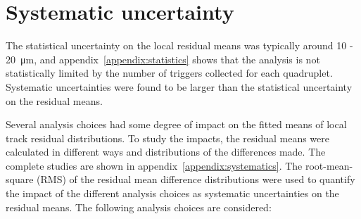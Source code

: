 \newpage
\restoregeometry

\section{Systematic uncertainty}
\label{sec:cosmics_sys_uncerts}

The statistical uncertainty on the local residual means was typically around \SI{10}{} - \SI{20}{\micro\meter}, and appendix~\ref{appendix:statistics} shows that the analysis is not statistically limited by the number of triggers collected for each quadruplet. Systematic uncertainties were found to be larger than the statistical uncertainty on the residual means.

Several analysis choices had some degree of impact on the fitted means of local track residual distributions. To study the impacts, the residual means were calculated in different ways and distributions of the differences made. The complete studies are shown in appendix~\ref{appendix:systematics}. The root-mean-square (RMS) of the residual mean difference distributions were used to quantify the impact of the different analysis choices as systematic uncertainties on the residual means. The following analysis choices are considered:
